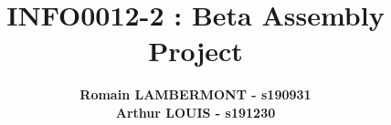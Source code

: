 \documentclass{article}
\begin{document}

\title{\Large{ INFO0012-2 : Beta Assembly Project}}
\vspace{1cm}
\author{\small{\bf Romain LAMBERMONT - s190931} \\ \small{\bf Arthur LOUIS - s191230}}

\maketitle


\end{document}
